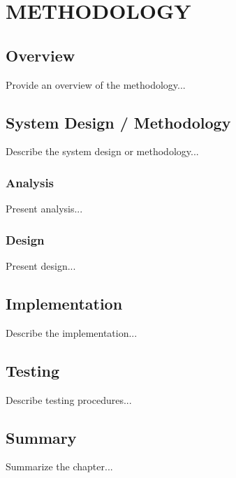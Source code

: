 
\chapter{METHODOLOGY}

\ifpdf
    \graphicspath{{3/figures/PNG}{3/figures/PDF}{3/figures}}
\else
    \graphicspath{{3/figures/EPS}{3/figures}}
\fi

\section{Overview}
Provide an overview of the methodology...

\section{System Design / Methodology}
Describe the system design or methodology...

\subsection{Analysis}
Present analysis...

\subsection{Design}
Present design...

\section{Implementation}
Describe the implementation...

\section{Testing}
Describe testing procedures...

\section{Summary}
Summarize the chapter...
